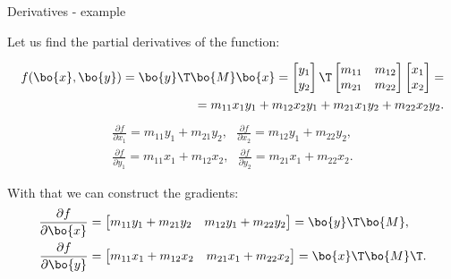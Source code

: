 \documentclass{beamer}
\begin{document}
\begin{frame}{Derivatives - example}
	\begin{flushleft}
		
		Let us find the partial derivatives of the function:
		
		\begin{align}
			f(\bo{x}, \bo{y}) = \bo{y}\T \bo{M} \bo{x} = 
			\begin{bmatrix}
				y_1 \\ y_2
			\end{bmatrix}\T
			\begin{bmatrix}
				m_{11} & m_{12} \\
				m_{21} & m_{22}
			\end{bmatrix}
			\begin{bmatrix}
				x_1 \\ x_2
			\end{bmatrix} =
			\\
			= m_{11} x_1 y_1 +m_{12} x_2 y_1 +m_{21} x_1 y_2 +m_{22} x_2 y_2 .
		\end{align}
		\begin{align}
			\frac{\partial f}{\partial x_1} = m_{11} y_1  +m_{21}  y_2,
			\ \ \
			\frac{\partial f}{\partial x_2} =  m_{12} y_1 +m_{22} y_2,
			\\
			\frac{\partial f}{\partial y_1} = m_{11} x_1 +m_{12} x_2,
			\ \ \
			\frac{\partial f}{\partial y_2} =  m_{21} x_1 +m_{22} x_2.
		\end{align}
		
		With that we can construct the gradients:
		\begin{align}
			\frac{\partial f}{\partial \bo{x}} &= 
			\begin{bmatrix}
				m_{11} y_1  +m_{21}  y_2 & m_{12} y_1 +m_{22} y_2
			\end{bmatrix}
			=
			\bo{y}\T \bo{M},
			\\
			\frac{\partial f}{\partial \bo{y}} &= 
			\begin{bmatrix}
				m_{11} x_1 +m_{12} x_2 & m_{21} x_1 +m_{22} x_2
			\end{bmatrix}
			=
			\bo{x}\T \bo{M}\T.
		\end{align}
		
		
	\end{flushleft}
\end{frame}
\end{document}
